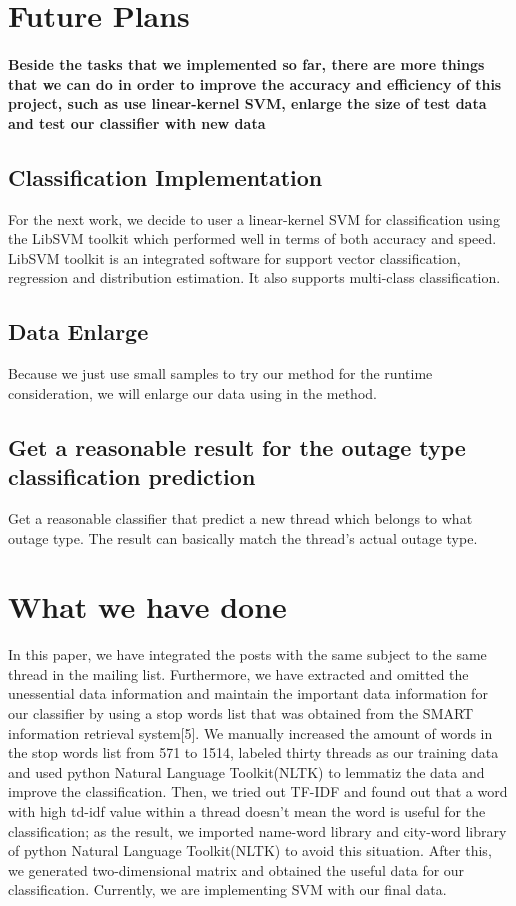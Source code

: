 \documentclass{sig-alternate}
\begin{document}
\section{Future Plans}
\paragraph{Beside the tasks that we implemented so far, there are more things that we can do in order to improve the accuracy and efficiency of this project, such as use linear-kernel SVM, enlarge the size of test data and test our classifier with new data}

\subsection{Classification Implementation}
For the next work, we decide to user a linear-kernel SVM for classification using the LibSVM toolkit which performed well in terms of both accuracy and speed. LibSVM toolkit is an integrated software for support vector classification, regression and distribution estimation. It also supports multi-class classification.
\subsection{Data Enlarge}
Because we just use small samples to try our method for the runtime consideration, we will enlarge our data using in the method.
\subsection{Get a reasonable result for the outage type classification prediction}
Get a reasonable classifier that predict a new thread which belongs to what outage type. The result can basically match the thread’s actual  outage type.

\section{What we have done}
In this paper, we have integrated the posts with the same subject to the same thread in the mailing list. Furthermore, we have extracted and omitted the unessential data information and maintain the important data information for our classifier by using a stop words list that was obtained from the SMART information retrieval system[5]. We manually increased the amount of words in the stop words list from 571 to 1514, labeled thirty threads as our training data and used python Natural Language Toolkit(NLTK) to lemmatiz the data and improve the classification. Then, we tried out TF-IDF and found out that a word with high td-idf value within a thread doesn't mean the word is useful for the classification; as the result, we imported name-word library and city-word library of python Natural Language Toolkit(NLTK) to avoid this situation. After this, we generated two-dimensional matrix and obtained the useful data for our classification. Currently, we are implementing SVM with our final data.
\end{document}

